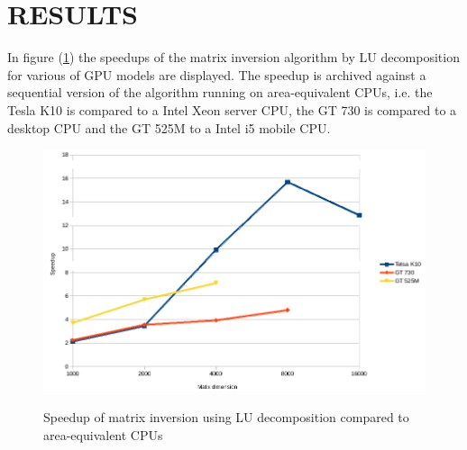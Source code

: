 
\section{RESULTS}\label{sec:results}
In figure (\ref{fig:speedup}) the speedups of the matrix inversion algorithm by LU decomposition for various of GPU models are displayed. The speedup is archived against a sequential version of the algorithm running on area-equivalent CPUs, i.e. the Tesla K10 is compared to a Intel Xeon server CPU, the GT 730 is compared to a desktop CPU and the GT 525M to a Intel i5 mobile CPU. 
\begin{figure}
	\includegraphics[width=18cm]{figs/speedup.png}
	\centering
	\label{fig:speedup}
	\caption{Speedup of matrix inversion using LU decomposition compared to area-equivalent CPUs}
\end{figure}

